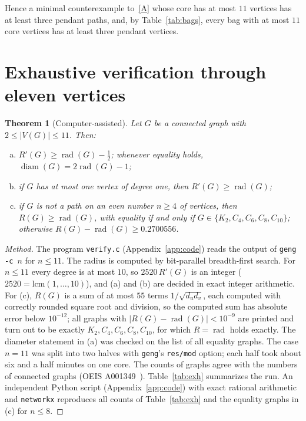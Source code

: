 \documentclass[11pt]{amsart}
\newtheorem{theorem}{Theorem}[section]
\theoremstyle{definition}
\DeclareMathOperator{\rad}{rad}
\DeclareMathOperator{\diam}{diam}
\newcommand{\Rp}{R'}
\newcommand{\kmax}{11}
\begin{document}
Hence a minimal counterexample to~\eqref{A} whose core has at most $11$ vertices has at least three pendant paths, and,
by Table~\ref{tab:bags}, every bag with at most $\kmax$ core vertices has at least three pendant vertices.

\section{Exhaustive verification through eleven vertices}\label{sec:exhaustive}

\begin{theorem}[Computer-assisted]\label{thm:exhaustive}
Let $G$ be a connected graph with $2\le|V(G)|\le11$. Then:
\begin{enumerate}[(a)]
\item $\Rp(G)\ge\rad(G)-\frac12$; whenever equality holds, $\diam(G)=2\rad(G)-1$;
\item if $G$ has at most one vertex of degree one, then $\Rp(G)\ge\rad(G)$;
\item if $G$ is not a path on an even number $n\ge4$ of vertices, then $R(G)\ge\rad(G)$, with equality if and only if
$G\in\{K_2,C_4,C_6,C_8,C_{10}\}$; otherwise $R(G)-\rad(G)\ge0.2700556$.
\end{enumerate}
\end{theorem}

\begin{proof}[Method]
The program \texttt{verify.c} (Appendix~\ref{app:code}) reads the output of \texttt{geng -c $n$} for $n\le11$. The radius is
computed by bit-parallel breadth-first search. For $n\le11$ every degree is at most $10$, so $2520\,\Rp(G)$ is an integer
($2520=\mathrm{lcm}(1,\dots,10)$), and (a) and (b) are decided in exact integer arithmetic. For (c), $R(G)$ is a sum of at
most $55$ terms $1/\sqrt{d_ud_v}$, each computed with correctly rounded square root and division, so the computed sum has
absolute error below $10^{-12}$; all graphs with $|R(G)-\rad(G)|<10^{-9}$ are printed and turn out to be exactly
$K_2,C_4,C_6,C_8,C_{10}$, for which $R=\rad$ holds exactly. The diameter statement in (a) was checked on the list of all
equality graphs. The case $n=11$ was split into two halves with \texttt{geng}'s \texttt{res/mod} option; each half took about six and a
half minutes on one core. The counts of graphs
agree with the numbers of connected graphs (OEIS A001349~\cite{OEIS}). Table~\ref{tab:exh} summarizes the run. An
independent Python script (Appendix~\ref{app:code}) with exact rational arithmetic and \texttt{networkx} reproduces all
counts of Table~\ref{tab:exh} and the equality graphs in (c) for $n\le8$.
\end{proof}
\end{document}
